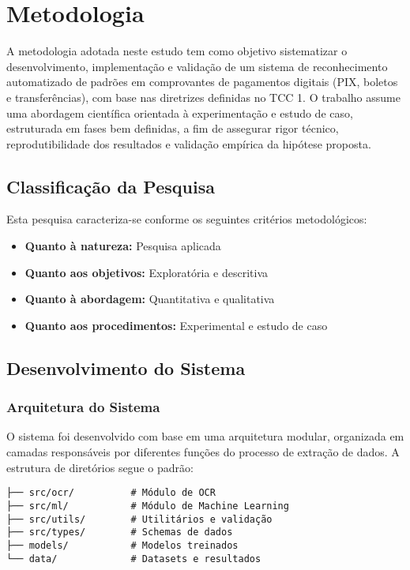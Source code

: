 \chapter{Metodologia}
\label{chap:metodologia}

A metodologia adotada neste estudo tem como objetivo sistematizar o desenvolvimento, implementação e validação de um sistema de reconhecimento automatizado de padrões em comprovantes de pagamentos digitais (PIX, boletos e transferências), com base nas diretrizes definidas no TCC 1. O trabalho assume uma abordagem científica orientada à experimentação e estudo de caso, estruturada em fases bem definidas, a fim de assegurar rigor técnico, reprodutibilidade dos resultados e validação empírica da hipótese proposta.

\section{Classificação da Pesquisa}

Esta pesquisa caracteriza-se conforme os seguintes critérios metodológicos:

\begin{itemize}
    \item \textbf{Quanto à natureza:} Pesquisa aplicada
    \item \textbf{Quanto aos objetivos:} Exploratória e descritiva
    \item \textbf{Quanto à abordagem:} Quantitativa e qualitativa
    \item \textbf{Quanto aos procedimentos:} Experimental e estudo de caso
\end{itemize}

\section{Desenvolvimento do Sistema}

\subsection{Arquitetura do Sistema}

O sistema foi desenvolvido com base em uma arquitetura modular, organizada em camadas responsáveis por diferentes funções do processo de extração de dados. A estrutura de diretórios segue o padrão:

\begin{verbatim}
├── src/ocr/          # Módulo de OCR
├── src/ml/           # Módulo de Machine Learning  
├── src/utils/        # Utilitários e validação
├── src/types/        # Schemas de dados
├── models/           # Modelos treinados
└── data/             # Datasets e resultados
\end{verbatim}


